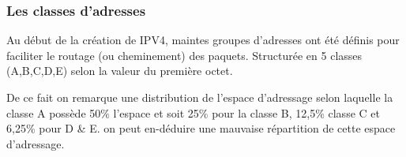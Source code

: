 \subsubsection{Les classes d’adresses}
Au début de la création de IPV4, maintes groupes d’adresses ont été définis
pour faciliter le routage (ou cheminement) des paquets. Structurée en 5 classes
(A,B,C,D,E) selon la valeur du première octet.


De ce fait on remarque une distribution de l’espace d’adressage selon laquelle
la classe A possède 50\% l’espace et soit 25\% pour la classe B, 12,5\% classe
C et 6,25\% pour D \& E. on peut en-déduire une mauvaise répartition de cette
espace d’adressage. 


